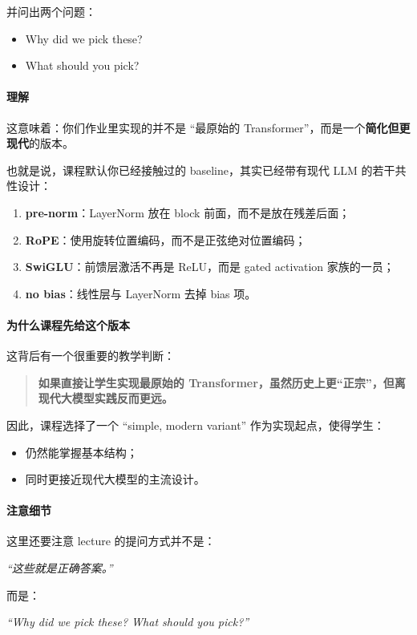 \documentclass[a4paper,UTF8]{article}
\numberwithin{equation}{section}
\begin{document}
并问出两个问题：
\begin{itemize}
    \item Why did we pick these?
    \item What should you pick?
\end{itemize}

\paragraph{理解}
这意味着：你们作业里实现的并不是 ``最原始的 Transformer''，而是一个\textbf{简化但更现代}的版本。

也就是说，课程默认你已经接触过的 baseline，其实已经带有现代 LLM 的若干共性设计：

\begin{enumerate}
    \item \textbf{pre-norm}：LayerNorm 放在 block 前面，而不是放在残差后面；
    \item \textbf{RoPE}：使用旋转位置编码，而不是正弦绝对位置编码；
    \item \textbf{SwiGLU}：前馈层激活不再是 ReLU，而是 gated activation 家族的一员；
    \item \textbf{no bias}：线性层与 LayerNorm 去掉 bias 项。
\end{enumerate}

\paragraph{为什么课程先给这个版本}
这背后有一个很重要的教学判断：

\begin{quote}
\textbf{如果直接让学生实现最原始的 Transformer，虽然历史上更“正宗”，但离现代大模型实践反而更远。}
\end{quote}

因此，课程选择了一个 ``simple, modern variant'' 作为实现起点，使得学生：
\begin{itemize}
    \item 仍然能掌握基本结构；
    \item 同时更接近现代大模型的主流设计。
\end{itemize}

\paragraph{注意细节}
这里还要注意 lecture 的提问方式并不是：
\begin{center}
\emph{“这些就是正确答案。”}
\end{center}
而是：
\begin{center}
\emph{“Why did we pick these? What should you pick?”}
\end{center}
\end{document}
